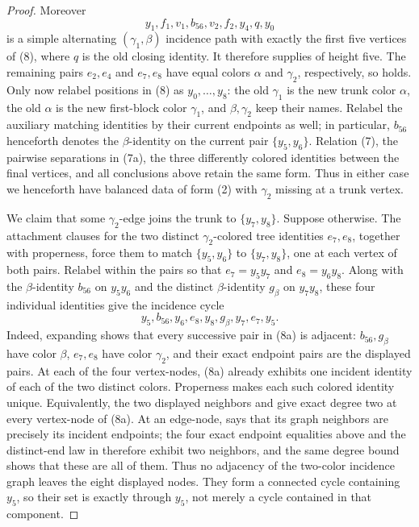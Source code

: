 \begin{proof}
Moreover
\[
 y_1,f_1,v_1,b_{56},v_2,f_2,y_4,q,y_0
\]
is a simple alternating $(\gamma_1,\beta)$ incidence path with exactly
the first five vertices of (8), where $q$ is the old closing identity.
It therefore supplies  of height five.
The remaining pairs $e_2,e_4$ and $e_7,e_8$ have equal colors
$\alpha$ and $\gamma_2$, respectively, so
 holds.  Only now relabel positions
in (8) as $y_0,\ldots,y_8$: the old $\gamma_1$ is the new trunk color
$\alpha$, the old $\alpha$ is the new first-block color $\gamma_1$, and
$\beta,\gamma_2$ keep their names.  Relabel the auxiliary matching
identities by their current endpoints as well; in particular, $b_{56}$
henceforth denotes the $\beta$-identity on the current pair
$\{y_5,y_6\}$.  Relation (7), the pairwise separations in (7a), the three
differently colored identities between the final vertices, and all
conclusions above retain the same form.  Thus in either case we henceforth
have balanced data of form (2) with $\gamma_2$ missing at a trunk vertex.

We claim that some $\gamma_2$-edge joins the trunk to
$\{y_7,y_8\}$.  Suppose otherwise.  The attachment clauses for the two
distinct $\gamma_2$-colored tree identities $e_7,e_8$, together with
properness, force them to match $\{y_5,y_6\}$ to $\{y_7,y_8\}$, one at
each vertex of both pairs.  Relabel within the pairs so that
$e_7=y_5y_7$ and $e_8=y_6y_8$.  Along with the $\beta$-identity
$b_{56}$ on $y_5y_6$ and the distinct $\beta$-identity $g_\beta$ on
$y_7y_8$, these four individual identities
give the incidence cycle
\[
 y_5,b_{56},y_6,e_8,y_8,g_\beta,y_7,e_7,y_5.        \tag{8a}
\]
Indeed, expanding  shows that every
successive pair in (8a) is adjacent: $b_{56},g_\beta$ have color $\beta$,
$e_7,e_8$ have color $\gamma_2$, and their exact endpoint pairs are the
displayed pairs.  At each of the four vertex-nodes, (8a) already exhibits
one incident identity of each of the two distinct colors.  Properness makes
each such colored identity unique.  Equivalently, the two displayed
neighbors and  give exact degree
two at every vertex-node of (8a).  At an edge-node, 
says that its graph neighbors are precisely its incident endpoints; the
four exact endpoint equalities above and the distinct-end law in
 therefore exhibit two neighbors, and the same
degree bound shows that these are all of them.  Thus no adjacency of the
two-color incidence graph leaves the eight displayed nodes.  They form a
connected cycle containing $y_5$, so their set is exactly
 through $y_5$, not merely a cycle contained in
that component.


\end{proof}
